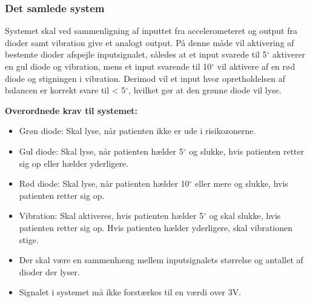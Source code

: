 \subsubsection{Det samlede system}
Systemet skal ved sammenligning af inputtet fra accelerometeret og output fra dioder samt vibration give et analogt output. På denne måde vil aktivering af bestemte dioder afspejle inputsignalet, således at et input svarede til 5$^{\circ}$ aktiverer en gul diode og vibration, mens et input svarende til 10$^{\circ}$ vil aktivere af en rød diode og stigningen i vibration. Derimod vil et input hvor opretholdelsen af balancen er korrekt svare til < 5$^{\circ}$, hvilket gør at den grønne diode vil lyse. 

\textbf{Overordnede krav til systemet:}
\begin{itemize}
\item Grøn diode: Skal lyse, når patienten ikke er ude i risikozonerne.  
\item Gul diode: Skal lyse, når patienten hælder 5$^{\circ}$ og slukke, hvis patienten retter sig op eller hælder yderligere.
\item Rød diode: Skal lyse, når patienten hælder 10$^{\circ}$ eller mere og slukke, hvis patienten retter sig op.
\item Vibration: Skal aktiveres, hvis patienten hælder 5$^{\circ}$ og skal slukke, hvis patienten retter sig op. Hvis patienten hælder yderligere, skal vibrationen stige.
\item Der skal være en sammenhæng mellem inputsignalets størrelse og antallet af dioder der lyser.
\item Signalet i systemet må ikke forstærkes til en værdi over 3V.
\end{itemize}




